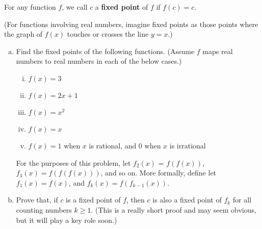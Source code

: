 \begin{problem}
\label{pr:fp-intro}
For any function $f$, we call $c$ a \textbf{fixed point} of $f$ if $f(c) = c$. 

(For functions involving real numbers, imagine fixed points as those points where the graph of $f(x)$ touches or crosses the line $y = x$.)


\begin{enumerate}[(a)]
\item Find the fixed points of the following functions. (Assume $f$ maps real numbers to real numbers in each of the below cases.)
\begin{enumerate}[i.]
\item $f(x) = 3$
\item $f(x) = 2x + 1$
\item $f(x) = x^2$
\item $f(x) = x$
\item $f(x) = 1$ when $x$ is rational, and 0 when $x$ is irrational


\end{enumerate}

For the purposes of this problem, let $f_2(x)$ = $f(f(x))$, $f_3(x) = f(f(f(x)))$, and so on. More formally, define let $f_1(x) = f(x)$, and $f_k(x) = f(f_{k-1}(x))$.

\item Prove that, if $c$ is a fixed point of $f$, then $c$ is also a fixed point of $f_k$ for all counting numbers $k \geq 1$. (This is a really short proof and may seem obvious, but it will play a key role soon.)
\end{enumerate}
\end{problem}


